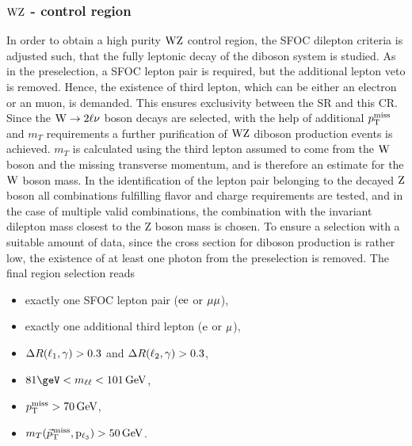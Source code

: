 \subsubsection*{$\mathrm{W}\mathrm{Z}$ - control region}
In order to obtain a high purity $\mathrm{W}\mathrm{Z}$ control region, the SFOC dilepton criteria is adjusted such, that the fully leptonic decay of the diboson system is studied. As in the preselection, a SFOC lepton pair is required, but the additional lepton veto is removed. Hence, the existence of third lepton, which can be either an electron or an muon, is demanded. This ensures exclusivity between the SR and this CR. Since the $\mathrm{W}\to2\ell\nu$ boson decays are selected, with the help of additional $p_{\mathrm{T}}^\text{miss}$ and $m_{T}$ requirements a further purification of $\mathrm{W}\mathrm{Z}$ diboson production events is achieved. $m_{T}$ is calculated using the third lepton assumed to come from the $\mathrm{W}$ boson and the missing transverse momentum, and is therefore an estimate for the $\mathrm{W}$ boson mass. In the identification of the lepton pair belonging to the decayed $\mathrm{Z}$ boson all combinations fulfilling flavor and charge requirements are tested, and in the case of multiple valid combinations, the combination with the invariant dilepton mass closest to the Z boson mass is chosen. To ensure a selection with a suitable amount of data, since the cross section for diboson production is rather low, the existence of at least one photon from the preselection is removed. The final region selection reads
\begin{itemize}
 \item exactly one SFOC lepton pair ($\mathrm{e}\mathrm{e}$ or $\mu\mu$),
 \item exactly one additional third lepton ($\mathrm{e}$ or ${\mu}$),
 \item $\Delta R(\ell_1,\gamma)>0.3$ and $\Delta R(\ell_2,\gamma)>0.3$,
 \item $81\geV<m_{\ell\ell}<101\GeV$,
 \item $p_{\mathrm{T}}^\text{miss}>70\,\text{Ge\hspace{-.08em}V}$,
 \item $m_{T}({\vec p}_{\mathrm{T}}^{\kern1pt\text{miss}},\mathrm{p_{\ell_3}})>50\,\text{Ge\hspace{-.08em}V}$.
\end{itemize}
